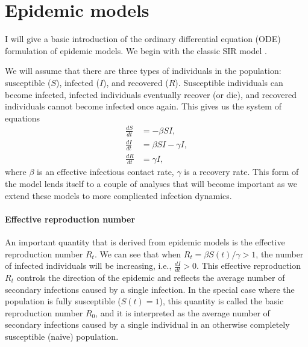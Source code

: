 %
%
%
\section{Epidemic models}

I will give a basic introduction of the ordinary differential equation (ODE) formulation of epidemic models.
We begin with the classic SIR model \cite{KermackMcKendrick1927}.

We will assume that there are three types of individuals in the population: susceptible ($S$), infected ($I$), and recovered ($R$). 
Susceptible individuals can become infected, infected individuals eventually recover (or die), and recovered individuals cannot become infected once again. 
This gives us the system of equations
\begin{align}
  \frac{d S}{d t} &= - \beta S I,\\ 
  \frac{d I}{d t} &= \beta S I - \gamma I,\\
  \frac{d R}{d t} &= \gamma I,
\end{align}
where $\beta$ is an effective infectious contact rate, $\gamma$ is a recovery rate. 
This form of the model lends itself to a couple of analyses that will become important as we extend these models to more complicated infection dynamics.

\paragraph{Effective reproduction number}%

An important quantity that is derived from epidemic models is the effective reproduction number $R_t$. 
We can see that when $R_{t} = \beta S(t) / \gamma > 1$, the number of infected individuals will be increasing, i.e., $\frac{dI}{dt} > 0$. 
This effective reproduction $R_{t}$ controls the direction of the epidemic and reflects the average number of secondary infections caused by a single infection.
In the special case where the population is fully susceptible ($S(t) = 1$), this quantity is called the basic reproduction number $R_{0}$, and it is interpreted as the average number of secondary infections caused by a single individual in an otherwise completely susceptible (naive) population.

